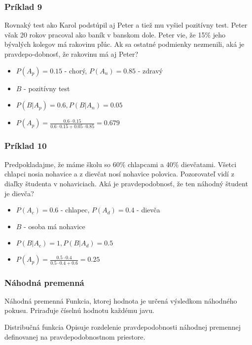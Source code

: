 \documentclass{beamer}
\begin{document}
\begin{frame}
\frametitle{Príklad 9}
Rovnaký test ako Karol podstúpil aj Peter a tiež mu vyšiel pozitívny test. Peter však 20 rokov pracoval ako baník v banskom dole. Peter vie, že 15\% jeho bývalých kolegov má rakovinu pľúc. Ak sa ostatné podmienky nezmenili, aká je pravdepo-dobnosť, že rakovinu má aj Peter?

\begin{itemize}
\item<2-> $P(A_p) = 0.15$ - chorý, $P(A_n) = 0.85$ - zdravý
\item<2-> $B$ - pozitívny test
\item<3-> $P(B| A_p) = 0.6, P(B|A_n) = 0.05$
\item<4-> $P(A_p) = \frac{0.6 \cdot 0.15}{0.6 \cdot 0.15 + 0.05 \cdot 0.85} = 0.679$ 
\end{itemize}
\end{frame}

\begin{frame}
\frametitle{Príklad 10}
Predpokladajme, že máme školu so 60\% chlapcami a 40\% dievčatami. Všetci chlapci nosia nohavice a z dievčat nosí nohavice polovica. Pozorovateľ vidí z diaľky študenta v nohaviciach. Aká je pravdepodobnosť, že ten náhodný študent je dievča?

\begin{itemize}
\item<2-> $P(A_c) = 0.6$ - chlapec, $P(A_d) = 0.4$ - dievča
\item<2-> $B$ - osoba má nohavice
\item<3-> $P(B| A_c) = 1, P(B|A_d) = 0.5$
\item<4-> $P(A_p) = \frac{0.5 \cdot 0.4}{0.5 \cdot 0.4 + 0.6} = 0.25$ 
\end{itemize}
\end{frame}

\begin{frame}
\frametitle{Náhodná premenná}

\begin{block}{Náhodná premenná}
Funkcia, ktorej hodnota je určená výsledkom náhodného pokusu. Priraďuje číselnú hodnotu každému javu.
\end{block}

\begin{block}{Distribučná funkcia}
Opisuje rozdelenie pravdepodobnosti náhodnej premennej definovanej na pravdepodobnostnom priestore.
\end{block}
\end{frame}
\end{document}
